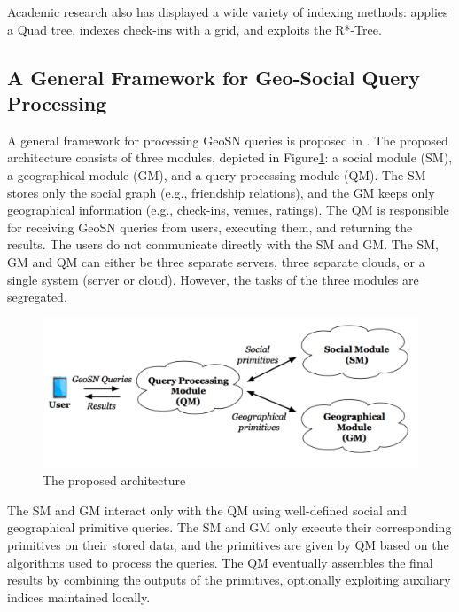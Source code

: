 Academic research also has displayed a wide variety of indexing methods: \cite{amir2007buddy} applies a Quad tree, \cite{bao2012geofeed} indexes check-ins with a grid, and \cite{Liu} exploits the R*-Tree.

\subsection{A General Framework for Geo-Social Query Processing\cite{armenatzoglou2013general}}
A general framework for processing GeoSN queries is proposed in \cite{armenatzoglou2013general}.
The proposed architecture consists of three modules, depicted in Figure\ref{fig:gen-arch}: a social module (SM), a geographical module (GM), and a query processing module (QM). 
The SM stores only the social graph (e.g., friendship relations), and the GM keeps only geographical information (e.g., check-ins, venues, ratings). The QM is responsible for receiving GeoSN queries from users, executing them, and returning the results. The users do not communicate directly with the SM and GM. The SM, GM and QM can either be three separate servers, three separate clouds, or a single system (server or cloud). However, the tasks of the three modules are segregated.

\begin{figure}[hbt]
  \includegraphics[width=\linewidth]{figs/gen-arch.png}
  \caption{The proposed architecture\cite{armenatzoglou2013general}}\label{fig:gen-arch}
\end{figure}

The SM and GM interact only with the QM using well-defined social and geographical primitive queries. 
The SM and GM only execute their corresponding primitives on their stored data, and the primitives are given by QM based on the algorithms used to process the queries. 
The QM eventually assembles the final results by combining the outputs of the primitives, optionally exploiting auxiliary indices maintained locally.

